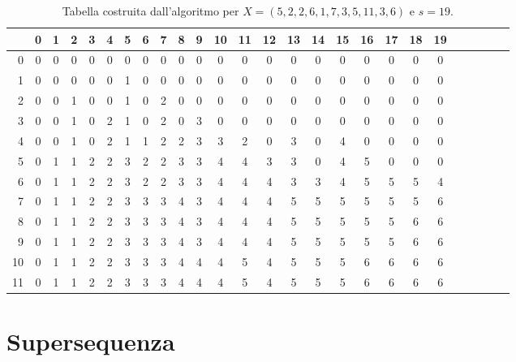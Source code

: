 \begin{table}
\begin{tabular}{r|*{25}{c}}
   &  0 &  1 &  2 &  3 &  4 &  5 &  6 &  7 &  8 &  9 & 10 & 11 & 12 & 13 & 14 & 15 & 16 & 17 & 18 & 19 \\ \hline
 0 &  0 &  0 &  0 &  0 &  0 &  0 &  0 &  0 &  0 &  0 &  0 &  0 &  0 &  0 &  0 &  0 &  0 &  0 &  0 &  0 \\
 1 &  0 &  0 &  0 &  0 &  0 &  1 &  0 &  0 &  0 &  0 &  0 &  0 &  0 &  0 &  0 &  0 &  0 &  0 &  0 &  0 \\
 2 &  0 &  0 &  1 &  0 &  0 &  1 &  0 &  2 &  0 &  0 &  0 &  0 &  0 &  0 &  0 &  0 &  0 &  0 &  0 &  0 \\
 3 &  0 &  0 &  1 &  0 &  2 &  1 &  0 &  2 &  0 &  3 &  0 &  0 &  0 &  0 &  0 &  0 &  0 &  0 &  0 &  0 \\
 4 &  0 &  0 &  1 &  0 &  2 &  1 &  1 &  2 &  2 &  3 &  3 &  2 &  0 &  3 &  0 &  4 &  0 &  0 &  0 &  0 \\
 5 &  0 &  1 &  1 &  2 &  2 &  3 &  2 &  2 &  3 &  3 &  4 &  4 &  3 &  3 &  0 &  4 &  5 &  0 &  0 &  0 \\
 6 &  0 &  1 &  1 &  2 &  2 &  3 &  2 &  2 &  3 &  3 &  4 &  4 &  4 &  3 &  3 &  4 &  5 &  5 &  5 &  4 \\
 7 &  0 &  1 &  1 &  2 &  2 &  3 &  3 &  3 &  4 &  3 &  4 &  4 &  4 &  5 &  5 &  5 &  5 &  5 &  5 &  6 \\
 8 &  0 &  1 &  1 &  2 &  2 &  3 &  3 &  3 &  4 &  3 &  4 &  4 &  4 &  5 &  5 &  5 &  5 &  5 &  6 &  6 \\
 9 &  0 &  1 &  1 &  2 &  2 &  3 &  3 &  3 &  4 &  3 &  4 &  4 &  4 &  5 &  5 &  5 &  5 &  5 &  6 &  6 \\
10 &  0 &  1 &  1 &  2 &  2 &  3 &  3 &  3 &  4 &  4 &  4 &  5 &  4 &  5 &  5 &  5 &  6 &  6 &  6 &  6 \\
11 &  0 &  1 &  1 &  2 &  2 &  3 &  3 &  3 &  4 &  4 &  4 &  5 &  4 &  5 &  5 &  5 &  6 &  6 &  6 &  6 
\end{tabular}
\caption{Tabella costruita dall'algoritmo per $X = (5,2,2,6,1,7,3,5,11,3,6)$ e $s = 19$.}
\end{table}

\clearpage

\section{Supersequenza}

